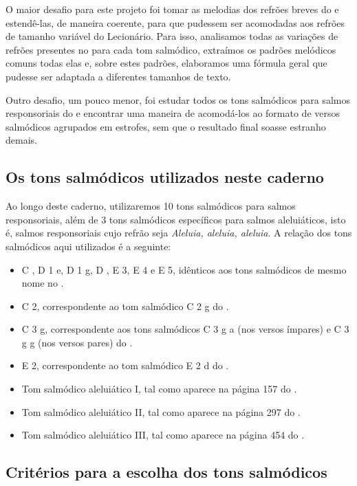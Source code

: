 O maior desafio para este projeto foi tomar as melodias dos refrões breves do {\GS} e estendê-las, de maneira coerente, para que pudessem ser acomodadas aos refrões de tamanho variável do Lecionário. Para isso, analisamos todas as variações de refrões presentes no {\GS} para cada tom salmódico, extraímos os padrões melódicos comuns todas elas e, sobre estes padrões, elaboramos uma fórmula geral que pudesse ser adaptada a diferentes tamanhos de texto.

Outro desafio, um pouco menor, foi estudar todos os tons salmódicos para salmos responsoriais do {\GS} e encontrar uma maneira de acomodá-los ao formato de versos salmódicos agrupados em estrofes, sem que o resultado final soasse estranho demais.

\subsection{Os tons salmódicos utilizados neste caderno}

Ao longo deste caderno, utilizaremos 10 tons salmódicos para salmos responsoriais, além de 3 tons salmódicos específicos para salmos aleluiáticos, isto é, salmos responsoriais cujo refrão seja \emph{Aleluia, aleluia, aleluia}. A relação dos tons salmódicos aqui utilizados é a seguinte:
\begin{itemize}
    \item C \protect\GreStar, D 1 e, D 1 g, D \protect\GreStar, E 3, E 4 e E 5, idênticos aos tons salmódicos de mesmo nome no {\GS}.
    \item C 2, correspondente ao tom salmódico C 2 g do {\GS}.
    \item C 3 g, correspondente aos tons salmódicos C 3 g a (nos versos ímpares) e C 3 g g (nos versos pares) do {\GS}.
    \item E 2, correspondente ao tom salmódico E 2 d do {\GS}.
    \item Tom salmódico aleluiático I, tal como aparece na página 157 do {\GS}.
    \item Tom salmódico aleluiático II, tal como aparece na página 297 do {\GS}.
    \item Tom salmódico aleluiático III, tal como aparece na página 454 do {\GS}.
\end{itemize}

\subsection{Critérios para a escolha dos tons salmódicos}

